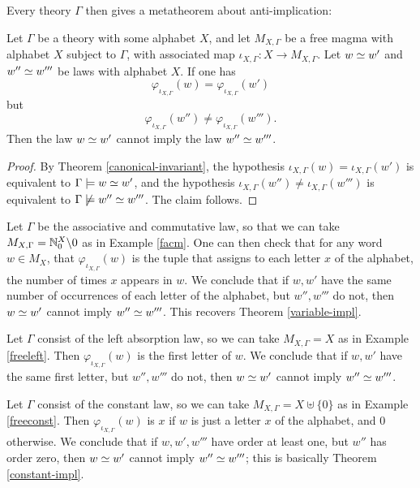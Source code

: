 Every theory $\Gamma$ then gives a metatheorem about anti-implication:

\begin{corollary}\label{anti-impl} Let $\Gamma$ be a theory with some alphabet $X$, and let $M_{X,\Gamma}$ be a free magma with alphabet $X$ subject to $\Gamma$, with associated map $\iota_{X,\Gamma}: X \to M_{X,\Gamma}$.   Let $w \simeq w'$ and $w'' \simeq w'''$ be laws with alphabet $X$.  If one has
$$ \varphi_{\iota_{X,\Gamma}}(w) = \varphi_{\iota_{X,\Gamma}}(w')$$
but
$$ \varphi_{\iota_{X,\Gamma}}(w'') \neq \varphi_{\iota_{X,\Gamma}}(w''').$$
Then the law $w \simeq w'$ cannot imply the law $w'' \simeq w'''$.
\end{corollary}

\begin{proof}  By Theorem \ref{canonical-invariant}, the hypothesis $\iota_{X,\Gamma}(w) = \iota_{X,\Gamma}(w')$ is equivalent to $\Gamma \models w \simeq w'$, and the hypothesis $\iota_{X,\Gamma}(w'') \neq \iota_{X,\Gamma}(w''')$ is equivalent to $\Gamma \not\models w'' \simeq w'''$.  The claim follows.
\end{proof}

\begin{example}  Let $\Gamma$ be the associative and commutative law, so that we can take $M_{X,\Gamma} = \mathbb{N}_0^X \backslash 0$ as in Example \ref{facm}.  One can then check that for any word $w \in M_X$, that $\varphi_{\iota_{X,\Gamma}}(w)$ is the tuple that assigns to each letter $x$ of the alphabet, the number of times $x$ appears in $w$.  We conclude that if $w,w'$ have the same number of occurrences of each letter of the alphabet, but $w'', w'''$ do not, then $w \simeq w'$ cannot imply $w'' \simeq w'''$.  This recovers Theorem \ref{variable-impl}.
\end{example}

\begin{example} Let $\Gamma$ consist of the left absorption law, so we can take $M_{X,\Gamma} = X$ as in Example \ref{freeleft}.  Then $\varphi_{\iota_{X,\Gamma}}(w)$ is the first letter of $w$.  We conclude that if $w,w'$ have the same first letter, but $w'', w'''$ do not, then $w \simeq w'$ cannot imply $w'' \simeq w'''$.
\end{example}

\begin{example}  Let $\Gamma$ consist of the constant law, so we can take $M_{X,\Gamma} = X \uplus \{0\}$ as in Example \ref{freeconst}. Then $\varphi_{\iota_{X,\Gamma}}(w)$ is $x$ if $w$ is just a letter $x$ of the alphabet, and $0$ otherwise.  We conclude that if $w,w', w'''$ have order at least one, but $w''$ has order zero, then $w \simeq w'$ cannot imply $w'' \simeq w'''$; this is basically Theorem \ref{constant-impl}.
\end{example}

